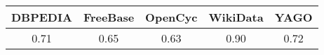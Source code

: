 \begin{table}[t]
\centering
\begin{minipage}{0.95\columnwidth}
\centering
\caption{}
\begin{tabular}{ccccc} \hline
DBPEDIA & FreeBase & OpenCyc & WikiData & YAGO
\\ \hline
0.71 & 0.65 & 0.63 & 0.90 & 0.72
\\ \hline
\end{tabular}
\label{table:fulfillment_degree}
\end{minipage}
\end{table}